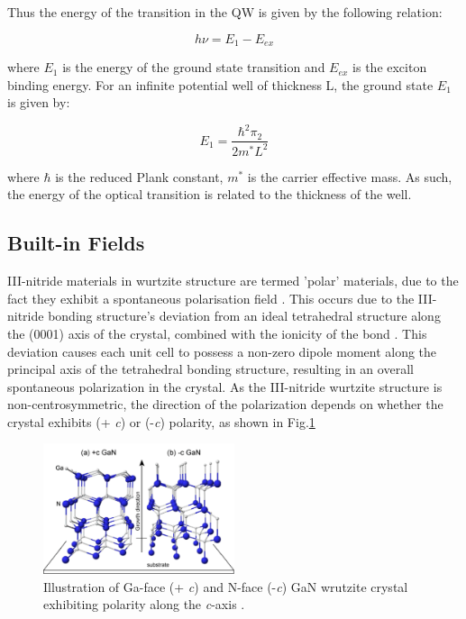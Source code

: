 Thus the energy of the transition in the QW is given by the following relation:

\begin{equation}
h\nu = E_{1}-E_{ex}
\end{equation}

where $E_{1}$ is the energy of the ground state transition and $E_{ex}$ is the exciton binding energy. For an infinite potential well of thickness L, the ground state $E_{1}$ is given by:

\begin{equation}
E_{1}=\frac{\hbar^{2}\pi_{2}}{2m^{*}L^{2}}
\end{equation}

where $\hbar$ is the reduced Plank constant, $m^{*}$ is the carrier effective mass. As such, the energy of the optical transition is related to the thickness of the well.

\subsection{Built-in Fields} 
\label{section1.1.3}
III-nitride materials in wurtzite structure are termed 'polar' materials, due to the fact they exhibit a spontaneous polarisation field \cite{Ambacher2002}. This occurs due to the III-nitride bonding structure's deviation from an ideal tetrahedral structure along the (0001) axis of the crystal, combined with the ionicity of the bond \cite{Ren2015}. This deviation causes each unit cell to possess a non-zero dipole moment along the principal axis of the tetrahedral bonding structure, resulting in an overall spontaneous polarization in the crystal. As the III-nitride wurtzite structure is non-centrosymmetric, the direction of the polarization depends on whether the crystal exhibits (+ {\it c}) or (-{\it c}) polarity, as shown in Fig.\ref{1.3}

\begin{figure}[h]
	\centering
	\includegraphics[width=0.5\textwidth]{Figs/Ch1/p2.png}
	\caption {Illustration of Ga-face (+ {\it c}) and N-face (-{\it c}) GaN wrutzite crystal exhibiting polarity along the {\it c}-axis \cite{Sumiya2004}.}
	\label{1.3}
\end{figure}
\FloatBarrier

